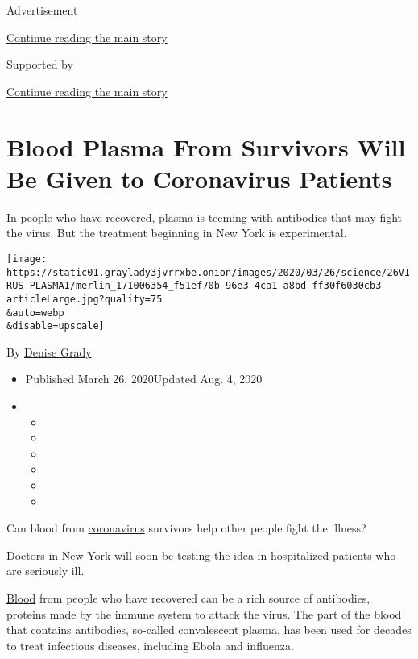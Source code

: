 Advertisement

\protect\hyperlink{after-top}{Continue reading the main story}

Supported by

\protect\hyperlink{after-sponsor}{Continue reading the main story}

\hypertarget{blood-plasma-from-survivors-will-be-given-to-coronavirus-patients}{%
\section{Blood Plasma From Survivors Will Be Given to Coronavirus
Patients}\label{blood-plasma-from-survivors-will-be-given-to-coronavirus-patients}}

In people who have recovered, plasma is teeming with antibodies that may
fight the virus. But the treatment beginning in New York is
experimental.

\texttt{[image: https://static01.graylady3jvrrxbe.onion/images/2020/03/26/science/26VIRUS-PLASMA1/merlin\_171006354\_f51ef70b-96e3-4ca1-a8bd-ff30f6030cb3-articleLarge.jpg?quality=75\\\&auto=webp\\\&disable=upscale]}

By \href{https://www.nytimes3xbfgragh.onion/by/denise-grady}{Denise
Grady}

\begin{itemize}
\item
  Published March 26, 2020Updated Aug. 4, 2020
\item
  \begin{itemize}
  \item
  \item
  \item
  \item
  \item
  \item
  \end{itemize}
\end{itemize}

Can blood from
\href{https://www.nytimes3xbfgragh.onion/2020/08/04/health/trump-plasma.html}{coronavirus}
survivors help other people fight the illness?

Doctors in New York will soon be testing the idea in hospitalized
patients who are seriously ill.

\href{https://www.nytimes3xbfgragh.onion/2020/08/04/health/trump-plasma.html}{Blood}
from people who have recovered can be a rich source of antibodies,
proteins made by the immune system to attack the virus. The part of the
blood that contains antibodies, so-called convalescent plasma, has been
used for decades to treat infectious diseases, including Ebola and
influenza.


